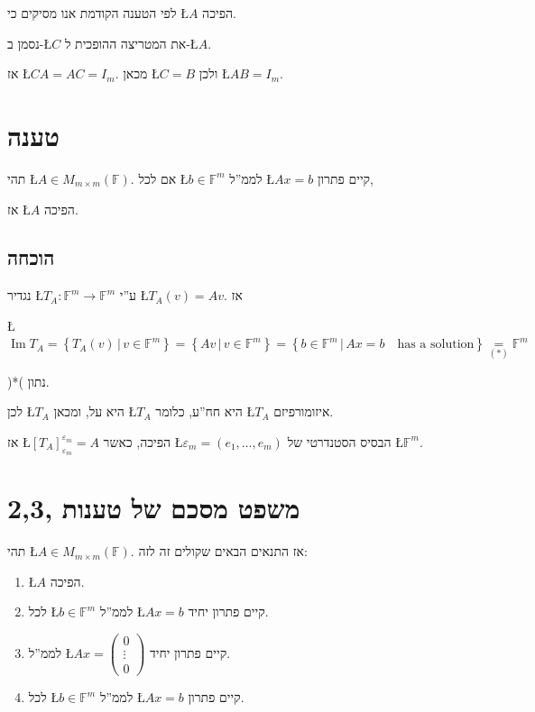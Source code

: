 \documentclass[english,hebrew]{article}
\begin{document}
לפי הטענה הקודמת אנו מסיקים כי \L{$A$} הפיכה.

נסמן ב-\L{$C$} את המטריצה ההופכית ל-\L{$A$}.

אז \L{$CA=AC=I_{m}$}. מכאן \L{$C=B$} ולכן \L{$AB=I_{m}$}.

\section{טענה {\endL}}

תהי \L{$A\in M_{m\times m}(\mathbb{F})$}. אם לכל \L{$b\in\mathbb{F}^{m}$}
לממ\textquotedblright ל \L{$Ax=b$} קיים פתרון,

אז \L{$A$} הפיכה.

\subsection{הוכחה}

נגדיר \L{$T_{A}:\mathbb{F}^{m}\rightarrow\mathbb{F}^{m}$} ע\textquotedblright י
\L{$T_{A}(v)=Av$}. אז
\begin{flushright}
\L{$\operatorname{Im}T_{A}=\left\{ T_{A}(v)\,|\,v\in\mathbb{F}^{m}\right\} =\left\{ Av\,|\,v\in\mathbb{F}^{m}\right\} =\left\{ b\in\mathbb{F}^{m}\,|\,Ax=b\quad\text{has a solution}\right\} \underset{(*)}{=}\mathbb{F}^{m}$}
\par\end{flushright}

){*}( נתון.

לכן \L{$T_{A}$} היא על, ומכאן \L{$T_{A}$} היא חח\textquotedblright ע,
כלומר \L{$T_{A}$} איזומורפיזם.

אז \L{$[T_{A}]_{\varepsilon_{m}}^{\varepsilon_{m}}=A$} הפיכה, כאשר
\L{$\varepsilon_{m}=(e_{1},\dots,e_{m})$} הבסיס הסטנדרטי של \L{$\mathbb{F}^{m}$}.

\newpage{}

\section{משפט מסכם של טענות {,2,3\endL}}

תהי \L{$A\in M_{m\times m}(\mathbb{F})$}. אז התנאים הבאים שקולים
זה לזה:
\begin{enumerate}
\item \L{$A$} הפיכה.
\item לכל \L{$b\in\mathbb{F}^{m}$} לממ\textquotedblright ל \L{$Ax=b$}
קיים פתרון יחיד.
\item לממ\textquotedblright ל \L{$Ax=\begin{pmatrix}0\\
\vdots\\
0
\end{pmatrix}$} קיים פתרון יחיד.
\item לכל \L{$b\in\mathbb{F}^{m}$} לממ\textquotedblright ל \L{$Ax=b$}
קיים פתרון.
\end{enumerate}
\end{document}
